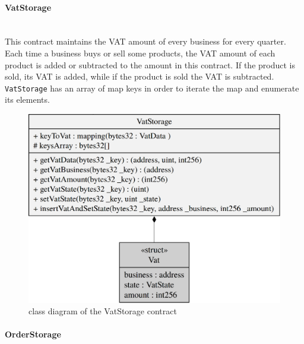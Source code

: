 \paragraph{VatStorage}\mbox{}\\

\noindent This contract maintains the VAT amount of every business for every quarter. Each time a business buys or sell some products, the VAT amount of each product is added or subtracted to the amount in this contract. If the product is sold, its VAT is added, while if the product is sold the VAT is subtracted. \\
\texttt{VatStorage} has an array of map keys in order to iterate the map and enumerate its elements. 

\begin{figure}[H]
	\centering
	\includegraphics[scale=0.30]{res/images/solidity/vatstorage.png}
	\caption{class diagram of the VatStorage contract}
\end{figure}
\pagebreak

\paragraph{OrderStorage}\mbox{}\\

